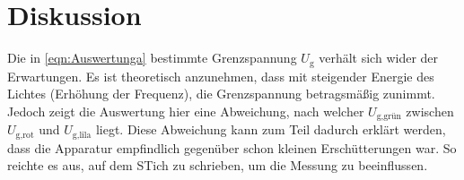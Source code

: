 \section{Diskussion}
\label{sec:Diskussion}

Die in \autoref{eqn:Auswertunga} bestimmte Grenzspannung $U_{\text{g}}$ verhält sich wider der Erwartungen. Es ist theoretisch anzunehmen, dass mit steigender Energie des Lichtes (Erhöhung der Frequenz), die Grenzspannung betragsmäßig 
zunimmt. Jedoch zeigt die Auswertung hier eine Abweichung, nach welcher $U_{\text{g,grün}}$ zwischen $U_{\text{g,rot}}$ und $U_{\text{g,lila}}$ liegt. 
Diese Abweichung kann zum Teil dadurch erklärt werden, dass die Apparatur empfindlich gegenüber schon kleinen Erschütterungen war. So reichte es aus, auf dem STich zu schrieben, um die Messung zu beeinflussen.